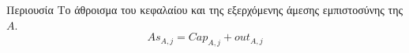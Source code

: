 {}
\begin{definitiongr}{Περιουσία}
  Το άθροισμα του κεφαλαίου και της εξερχόμενης άμεσης εμπιστοσύνης της $A$.
  \begin{equation}
    As_{A, j} = Cap_{A, j} + out_{A, j}
  \end{equation}
\end{definitiongr}
